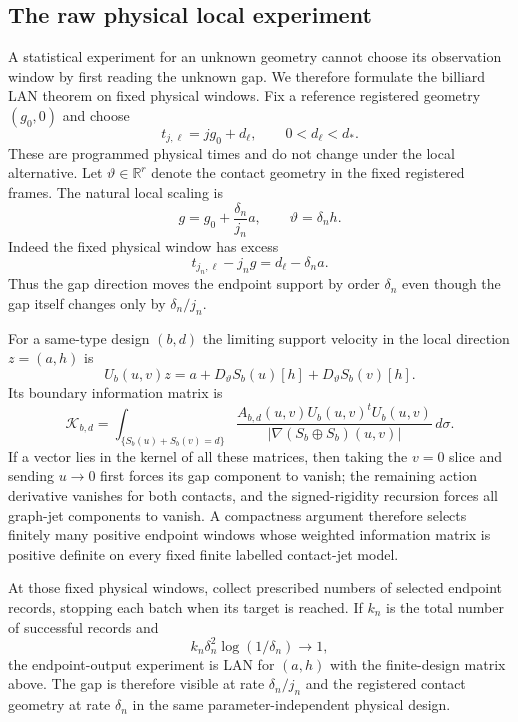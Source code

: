 \subsection{The raw physical local experiment}

A statistical experiment for an unknown geometry cannot choose its observation
window by first reading the unknown gap.  We therefore formulate the billiard
LAN theorem on fixed physical windows.  Fix a reference registered geometry
$(g_0,0)$ and choose
\[
                  t_{j,\ell}=jg_0+d_\ell,
 \qquad 0<d_\ell<d_*.
\]
These are programmed physical times and do not change under the local
alternative.  Let $\vartheta\in\mathbb R^r$ denote the contact geometry in
the fixed registered frames.  The natural local scaling is
\begin{equation}\label{eq:intro-multirate}
       g=g_0+\frac{\delta_n}{j_n}a,
 \qquad
       \vartheta=\delta_n h.
\end{equation}
Indeed the fixed physical window has excess
\[
 t_{j_n,\ell}-j_ng=d_\ell-\delta_na.
\]
Thus the gap direction moves the endpoint support by order $\delta_n$ even
though the gap itself changes only by $\delta_n/j_n$.

For a same-type design $(b,d)$ the limiting support velocity in the local
direction $z=(a,h)$ is
\[
 U_b(u,v)z
 =a+D_\vartheta S_b(u)[h]+D_\vartheta S_b(v)[h].
\]
Its boundary information matrix is
\[
 \mathcal K_{b,d}
 =\int_{\{S_b(u)+S_b(v)=d\}}
 \frac{A_{b,d}(u,v)U_b(u,v)^tU_b(u,v)}
 {|\nabla(S_b\oplus S_b)(u,v)|}\,d\sigma.
\]
If a vector lies in the kernel of all these matrices, then taking the
$v=0$ slice and sending $u\to0$ first forces its gap component to vanish;
the remaining action derivative vanishes for both contacts, and the
signed-rigidity recursion forces all graph-jet components to vanish.  A
compactness argument therefore selects finitely many positive endpoint
windows whose weighted information matrix is positive definite on every
fixed finite labelled contact-jet model.

At those fixed physical windows, collect prescribed numbers of selected
endpoint records, stopping each batch when its target is reached.  If
$k_n$ is the total number of successful records and
\[
 k_n\delta_n^2\log(1/\delta_n)\to1,
\]
the endpoint-output experiment is LAN for $(a,h)$ with the finite-design
matrix above.  The gap is therefore visible at rate $\delta_n/j_n$ and the
registered contact geometry at rate $\delta_n$ in the same
parameter-independent physical design.


